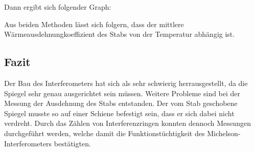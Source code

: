 Dann ergibt sich folgender Graph:

Aus beiden Methoden lässt sich folgern, dass der mittlere Wärmeausdehnungkoeffizient des Stabs von der Temperatur abhängig ist.

\subsection{Fazit}


Der Bau des Interferometers hat sich als sehr schwierig herrausgestellt, da die Spiegel sehr genau ausgerichtet sein müssen.
Weitere Probleme sind bei der Messung der Ausdehnung des Stabs entstanden. Der vom Stab geschobene Spiegel musste so auf einer Schiene befestigt sein, dass er sich dabei nicht verdreht.
Durch das Zählen von Interferenzringen konnten dennoch Messungen durchgeführt werden, welche damit die Funktionstüchtigkeit des Michelson-Interferometers bestätigten.


